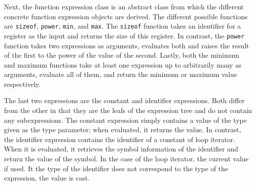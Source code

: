 Next, the function expression class is an abstract class from which the different concrete function expression objects are derived. The different possible functions are \texttt{sizeof}, \texttt{power}, \texttt{min}, and \texttt{max}. The \texttt{sizeof} function takes an identifier for a register as the input and returns the size of this register. In contrast, the \texttt{power} function takes two expressions as arguments, evaluates both and raises the result of the first to the power of the value of the second. Lastly, both the minimum and maximum functions take at least one expression up to arbitrarily many as arguments, evaluate all of them, and return the minimum or maximum value respectively.

The last two expressions are the constant and identifier expressions. Both differ from the other in that they are the leafs of the expression tree and do not contain any subexpressions. The constant expression simply contains a value of the type given as the type parameter; when evaluated, it returns the value. In contrast, the identifier expression contains the identifier of a constant of loop iterator. When it is evaluated, it retrieves the symbol information of the identifier and return the value of the symbol. In the case of the loop iterator, the current value if used. It the type of the identifier does not correspond to the type of the expression, the value is cast.